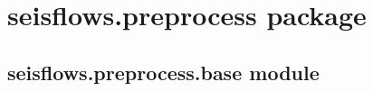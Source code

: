 \documentclass[letterpaper,10pt,english]{sphinxmanual}
\begin{document}
\section{seisflows.preprocess package}
\label{\detokenize{ref/seisflows.preprocess:seisflows-preprocess-package}}\label{\detokenize{ref/seisflows.preprocess:sfpreprocess}}\label{\detokenize{ref/seisflows.preprocess::doc}}

\subsection{seisflows.preprocess.base module}
\label{\detokenize{ref/seisflows.preprocess:module-seisflows.preprocess.base}}\label{\detokenize{ref/seisflows.preprocess:seisflows-preprocess-base-module}}
\end{document}
